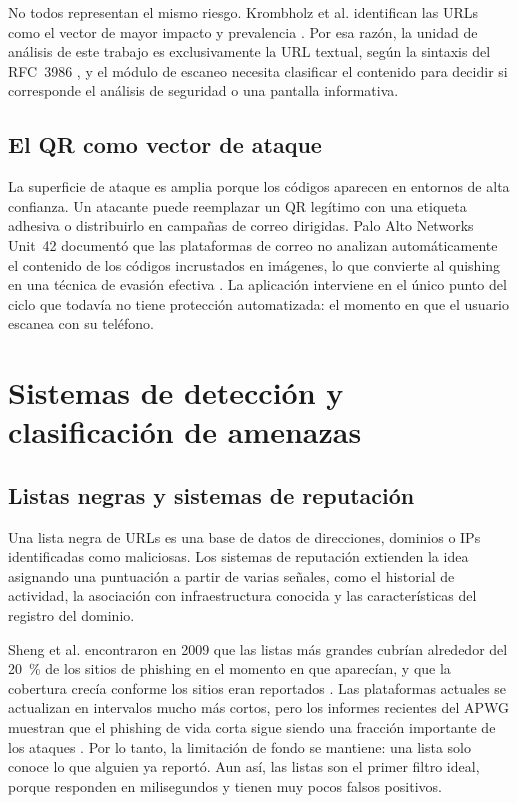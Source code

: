 No todos representan el mismo riesgo. Krombholz et al. identifican las URLs como el vector de mayor impacto y prevalencia \cite{krombholz2014qr}. Por esa razón, la unidad de análisis de este trabajo es exclusivamente la URL textual, según la sintaxis del RFC~3986 \cite{rfc3986}, y el módulo de escaneo necesita clasificar el contenido para decidir si corresponde el análisis de seguridad o una pantalla informativa.

\subsection{El QR como vector de ataque}

La superficie de ataque es amplia porque los códigos aparecen en entornos de alta confianza. Un atacante puede reemplazar un QR legítimo con una etiqueta adhesiva o distribuirlo en campañas de correo dirigidas. Palo Alto Networks Unit~42 documentó que las plataformas de correo no analizan automáticamente el contenido de los códigos incrustados en imágenes, lo que convierte al quishing en una técnica de evasión efectiva \cite{unit42_2023qr}. La aplicación interviene en el único punto del ciclo que todavía no tiene protección automatizada: el momento en que el usuario escanea con su teléfono.

\section{Sistemas de detección y clasificación de amenazas}

\subsection{Listas negras y sistemas de reputación}

Una lista negra de URLs es una base de datos de direcciones, dominios o IPs identificadas como maliciosas. Los sistemas de reputación extienden la idea asignando una puntuación a partir de varias señales, como el historial de actividad, la asociación con infraestructura conocida y las características del registro del dominio.

Sheng et al. encontraron en 2009 que las listas más grandes cubrían alrededor del 20~\% de los sitios de phishing en el momento en que aparecían, y que la cobertura crecía conforme los sitios eran reportados \cite{sheng2009empirical}. Las plataformas actuales se actualizan en intervalos mucho más cortos, pero los informes recientes del APWG muestran que el phishing de vida corta sigue siendo una fracción importante de los ataques \cite{apwg2024q1,apwg2025q1}. Por lo tanto, la limitación de fondo se mantiene: una lista solo conoce lo que alguien ya reportó. Aun así, las listas son el primer filtro ideal, porque responden en milisegundos y tienen muy pocos falsos positivos.


